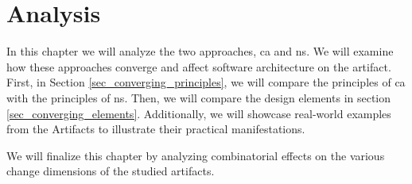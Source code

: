 \chapter{Analysis} \label{chap_evaluation}

In this chapter we will analyze the two approaches, \gls{ca} and \gls{ns}. We will examine
how these approaches converge and affect software architecture on the artifact. First, in
Section \ref{sec_converging_principles}, we will compare the principles of \gls{ca} with
the principles of \gls{ns}. Then, we will compare the design elements in section
\ref{sec_converging_elements}. Additionally, we will showcase real-world examples from the
Artifacts to illustrate their practical manifestations.

We will finalize this chapter by analyzing combinatorial effects on the various change
dimensions of the studied artifacts.







